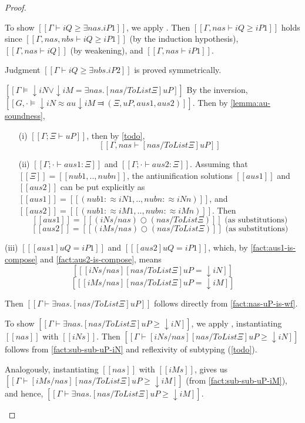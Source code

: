\begin{proof}
\begin{caseof}
     To show $[[Γ ⊢ iQ ≥ ∃nas.iP1]]$, we apply
     .
     Then $[[Γ, nas ⊢ iQ ≥ iP1]]$ holds since
     $[[Γ, nas, nbs ⊢ iQ ≥ iP1]]$ (by the induction hypothesis),
     $[[Γ, nas ⊢ iQ]]$ (by weakening), and $[[Γ, nas ⊢ iP1]]$.

     Judgment $[[Γ ⊢ iQ ≥ ∃nbs.iP2]]$ is proved symmetrically.
  \item $[[Γ ⊨ ↓iN ∨ ↓iM = ∃nas.[nas / ToList Ξ]uP]]$
    By the inversion, $[[G,· ⊨ ↓iN ≈au ↓iM ⫤ (Ξ, uP, aus1, aus2)]]$.
    Then by \cref{lemma:au-soundness},
    \begin{enumerate}
    \item[(i)] $[[Γ ; Ξ ⊢ uP]]$, then
      by \cref{todo},
      \begin{equation} \label{fact:nas-uP-is-wf} [[Γ, nas ⊢ [nas / ToList Ξ]uP]] \end{equation}
    \item[(ii)] $[[Γ ; · ⊢ aus1 : Ξ]]$ and $[[Γ ; · ⊢ aus2 : Ξ]]$.
      Assuming that $[[Ξ]] = [[nub1,..,nubn]]$,
      the antiunification solutions $[[aus1]]$ and $[[aus2]]$ can be
      put explicitly as $[[aus1]] = [[(nub1 :≈ iN1,..,nubn :≈ iNn)]]$,
      and $[[aus2]] = [[(nub1 :≈ iM1,..,nubn :≈ iMn)]]$.
      Then
      \begin{equation}
        \label{fact:aus1-is-compose}
        [[ aus1 ]] = [[ (iNs / nas) ○ (nas / ToList Ξ) ]] \text{ (as substitutions)}
      \end{equation}
      \begin{equation}
        \label{fact:aus2-is-compose}
        [[ aus2 ]] = [[ (iMs / nas) ○ (nas / ToList Ξ) ]]\text{ (as substitutions)}
      \end{equation}
    \end{enumerate}
  \item[(iii)] $[[ [aus1] uQ = iP1 ]]$ and $[[ [aus2] uQ = iP1 ]]$,
    which, by \ref{fact:aus1-is-compose} and \ref{fact:aus2-is-compose},
    means
    \begin{equation}
      \label{fact:sub-sub-uP-iN}
      [[ [iNs / nas][nas / ToList Ξ]uP = ↓iN ]]
    \end{equation}
    \begin{equation}
      \label{fact:sub-sub-uP-iM}
      [[ [iMs / nas][nas / ToList Ξ]uP = ↓iM ]]
    \end{equation}

    Then $[[Γ ⊢ ∃nas.[nas / ToList Ξ]uP]]$
    follows directly from \ref{fact:nas-uP-is-wf}.

    To show $[[Γ ⊢ ∃nas.[nas / ToList Ξ]uP ≥ ↓iN]]$,
    we apply ,
    instantiating $[[nas]]$ with $[[iNs]]$.
    Then $[[Γ ⊢ [iNs / nas][nas / ToList Ξ]uP ≥ ↓iN ]]$ follows
    from \ref{fact:sub-sub-uP-iN} and reflexivity of subtyping (\cref{todo}).

    Analogously, instantiating $[[nas]]$ with $[[iMs]]$,
    gives us $[[Γ ⊢ [iMs / nas][nas / ToList Ξ]uP ≥ ↓iM ]]$
    (from \ref{fact:sub-sub-uP-iM}), and hence,
    $[[Γ ⊢ ∃nas.[nas / ToList Ξ]uP ≥ ↓iM]]$.

  \end{caseof}

\end{proof}


